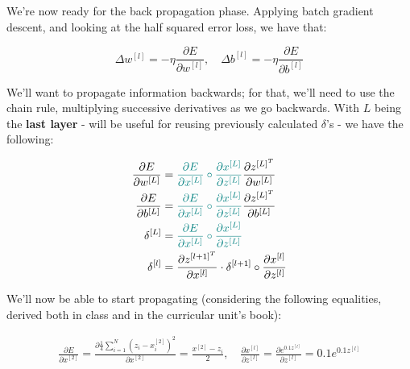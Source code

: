 \documentclass[12pt]{article}
\begin{document}
\begin{enumerate}[leftmargin=\labelsep]
        We're now ready for the back propagation phase. Applying batch gradient descent,
        and looking at the half squared error loss, we have that:

        \begin{equation*}
          \Delta w^{[l]} = - \eta \frac{\partial E}{\partial w^{[l]}}, \quad
          \Delta b^{[l]} = - \eta \frac{\partial E}{\partial b^{[l]}}
        \end{equation*}

        We'll want to propagate information backwards; for that, we'll need to use
        the chain rule, multiplying successive derivatives as we go backwards.
        With $L$ being the \textbf{last layer} - will be useful for reusing previously
        calculated $\delta$'s - we have the following:

        \begin{align*}
          \frac{\partial E}{\partial w^{[L]}} & = \textcolor{teal}{\frac{\partial E}{\partial x^{[L]}} \circ
            \frac{\partial x^{[L]}}{\partial z^{[L]}}}
          \frac{\partial z^{[L]^T}}{\partial w^{[L]}}                                                        \\
          \frac{\partial E}{\partial b^{[L]}} & = \textcolor{teal}{\frac{\partial E}{\partial x^{[L]}} \circ
            \frac{\partial x^{[L]}}{\partial z^{[L]}}}
          \frac{\partial z^{[L]^T}}{\partial b^{[L]}}                                                        \\
          \delta^{[L]}                        & = \textcolor{teal}{\frac{\partial E}{\partial x^{[L]}} \circ
          \frac{\partial x^{[L]}}{\partial z^{[L]}}}                                                         \\
          \delta^{[l]}                        & =
          \frac{\partial z^{[l + 1]^T}}{\partial x^{[l]}} \cdot \delta^{[l + 1]} \circ \frac{\partial x^{[l]}}{\partial z^{[l]}}
        \end{align*}

        We'll now be able to start propagating (considering the following equalities,
        derived both in class and in the curricular unit's book):


        \begin{equation*}
          \begin{aligned}
            \frac{\partial E}{\partial x^{[2]}} = \frac{\partial \frac{1}{4}\sum_{i=1}^N (z_i - x_i^{[2]})^2}{\partial x^{[2]}} = \frac{x^{[2]} - z_i}{2}, \quad
            \frac{\partial x^{[l]}}{\partial z^{[l]}} = \frac{\partial e^{0.1z^{[l]}}}{\partial z^{[l]}} = 0.1e^{0.1z^{[l]}}
          \end{aligned}
        \end{equation*}


\end{enumerate}
\end{document}
